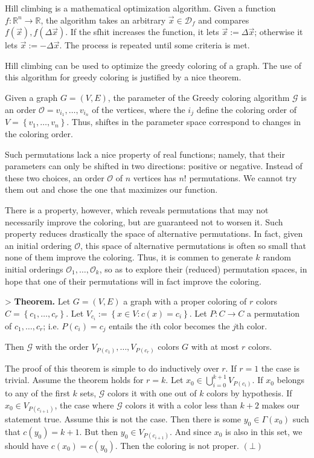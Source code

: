 \documentclass[a4paper, 12pt]{article}
\begin{document}
Hill climbing is a mathematical optimization algorithm. Given a function $f :
\mathbb{R}^n \to \mathbb{R}$, the algorithm takes an arbitrary
$\overrightarrow{x} \in \mathcal{D}_f$ and compares $f(\overrightarrow{x}),
f(\Delta \overrightarrow{x})$. If the sfhit increases the
function, it lets $\overrightarrow{x} := \Delta\overrightarrow{x}$; otherwise 
it lets $\overrightarrow{x} := -\Delta\overrightarrow{x}$. The process 
is repeated until some criteria is met.

Hill climbing can be used to optimize the greedy coloring of a graph. The use
of this algorithm for greedy coloring is justified by a nice theorem.

Given a graph $G = (V, E)$, the parameter of the Greedy coloring algorithm
$\mathcal{G}$ is an order $\mathcal{O} = v_{i_1}, \ldots, v_{i_n}$ of the
vertices, where the $i_j$ define the coloring order of $V = \left\{ v_1,
\ldots, v_n \right\} $. Thus, shiftes in the parameter space correspond to
changes in the coloring order. 

Such permutations lack a nice property of real functions; namely, that their
parameters can only be shifted in two directions: positive or negative. Instead
of these two choices, an order $\mathcal{O}$ of $n$ vertices has $n!$
permutations. We cannot try them out and chose the one that maximizes our
function.

There is a property, however, which reveals permutations that may not
necessarily improve the coloring, but are guaranteed not to worsen it. Such
property reduces drastically the space of alternative permutations. In fact,
given an initial ordering $\mathcal{O}$, this space of alternative permutations
is often so small that none of them improve the coloring. Thus, it is commen to
generate $k$ random initial orderings $\mathcal{O}_1, \ldots, \mathcal{O}_k$,
so as to explore their (reduced) permutation spaces, in hope that one of their
permutations will in fact improve the coloring. 

> \textbf{Theorem.} Let $G = (V, E)$ a graph with a proper coloring of $r$
colors $C = \left\{ c_1, \ldots, c_r \right\} $. Let $V_{c_i} := \left\{ x\in V
: c(x) =c_i \right\} $. Let $P : C \to C $ a permutation of $c_1, \ldots, c_r$;
i.e. $P(c_i) = c_j$ entails the $i$th color becomes the $j$th color.

Then $\mathcal{G}$ with the order $V_{P(c_1)}, \ldots, V_{P(c_r)}$ colors 
$G$ with at most $r$ colors.


The proof of this theorem is simple to do inductively over $r$. If $r = 1$ the
case is trivial. Assume the theorem holds for $r = k$. Let $x_0 \in
\bigcup_{i=0}^{k+1} V_{P(c_{i})}$. If $x_0$ belongs to any of the first $k$
sets, $\mathcal{G}$ colors it with one out of $k$ colors by hypothesis.
If $x_0 \in V_{P(c_{i+1})}$, the case where $\mathcal{G}$
colors it with a color less than $k+2$ makes our statement true.
Assume this is not the case. Then there is some $y_0 \in \Gamma(x_0)$
such that $c(y_0) = k + 1$. But then $y_0 \in V_{P(c_{i+1})}$.
And since $x_0$ is also in this set, we should have $c(x_0) = c(y_0)$.
Then the coloring is not proper. $(\bot)$
\end{document}
